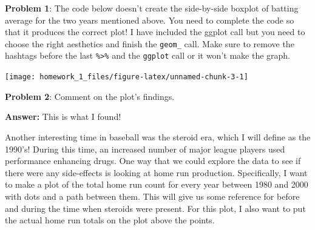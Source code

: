 \documentclass[
]{article}
\newenvironment{Shaded}{\begin{snugshade}}{\end{snugshade}}
\newcommand{\DataTypeTok}[1]{\textcolor[rgb]{0.13,0.29,0.53}{#1}}
\newcommand{\DecValTok}[1]{\textcolor[rgb]{0.00,0.00,0.81}{#1}}
\newcommand{\KeywordTok}[1]{\textcolor[rgb]{0.13,0.29,0.53}{\textbf{#1}}}
\newcommand{\NormalTok}[1]{#1}
\newcommand{\OperatorTok}[1]{\textcolor[rgb]{0.81,0.36,0.00}{\textbf{#1}}}
\newcommand{\StringTok}[1]{\textcolor[rgb]{0.31,0.60,0.02}{#1}}
\begin{document}
\textbf{Problem 1}: The code below doesn't create the side-by-side
boxplot of batting average for the two years mentioned above. You need
to complete the code so that it produces the correct plot! I have
included the ggplot call but you need to choose the right aesthetics and
finish the \texttt{geom\_} call. Make sure to remove the hashtags before
the last \texttt{\%\textgreater{}\%} and the \texttt{ggplot} call or it
won't make the graph.

\begin{Shaded}
\end{Shaded}

\begin{center}\texttt{[image: homework\_1\_files/figure-latex/unnamed-chunk-3-1]} \end{center}

\textbf{Problem 2}: Comment on the plot's findings.

\textbf{Answer:} This is what I found!

Another interesting time in baseball was the steroid era, which I will
define as the 1990's! During this time, an increased number of major
league players used performance enhancing drugs. One way that we could
explore the data to see if there were any side-effects is looking at
home run production. Specifically, I want to make a plot of the total
home run count for every year between 1980 and 2000 with dots and a path
between them. This will give us some reference for before and during the
time when steroids were present. For this plot, I also want to put the
actual home run totals on the plot above the points.
\end{document}
